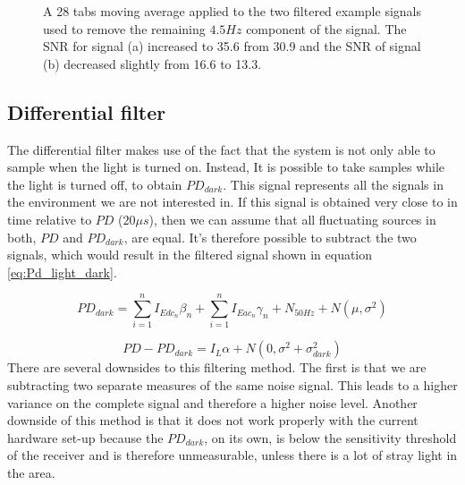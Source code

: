 \begin{figure}
	\centering     %
	\caption{A 28 tabs moving average applied to the two filtered example signals used to remove the remaining $4.5Hz$ component of the signal. The SNR for signal (a) increased to 35.6 from 30.9 and the SNR of signal (b) decreased slightly from 16.6 to 13.3.\label{movavg_example}}
\end{figure}

\subsection{Differential filter}
The differential filter makes use of the fact that the system is not only able to sample when the light is turned on. Instead, It is possible to take samples while the light is turned off, to obtain $PD_{dark}$. This signal represents all the signals in the environment we are not interested in. If this signal is obtained very close to in time relative to $PD$ ($20\mu s$), then we can assume that all fluctuating sources in both, $PD$ and $PD_{dark}$, are equal. It's therefore possible to subtract the two signals, which would result in the filtered signal shown in equation \ref{eq:Pd_light_dark}.

\begin{equation}
\label{eq:Pd_dark}
PD_{dark} = \sum_{i=1}^n I_{Edc_{n}} \beta_{n} + \sum_{i=1}^n I_{Eac{_n}} \gamma_{n} + N_{50Hz} + N(\mu,\sigma^2)
\end{equation}

\begin{equation}
\label{eq:Pd_light_dark}
PD - PD_{dark} = I_{L} \alpha + N(0,\sigma^2 + \sigma^2_{dark})
\end{equation}
There are several downsides to this filtering method. The first is that we are subtracting two separate measures of the same noise signal. This leads to a higher variance on the complete signal and therefore a higher noise level. Another downside of this method is that it does not work properly with the current hardware set-up because the $PD_{dark}$, on its own, is below the sensitivity threshold of the receiver and is therefore unmeasurable, unless there is a lot of stray light in the area.

